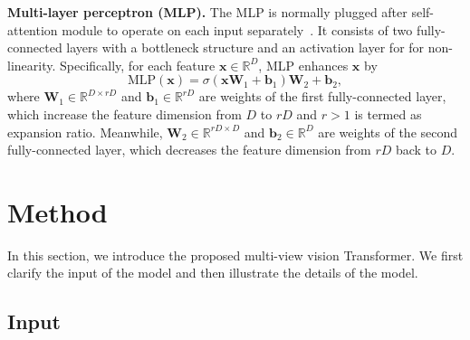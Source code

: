 \documentclass{bmvc2k}
\begin{document}
\vspace{0.1in}

\noindent \textbf{Multi-layer perceptron (MLP).} The MLP is normally plugged after self-attention module to operate on each input separately~\cite{vaswani2017attention}. It consists of two fully-connected layers with a bottleneck structure and an activation layer for for non-linearity. Specifically, for each feature $\mathbf{x} \in \mathbb{R}^{D}$, MLP enhances $\mathbf{x}$ by 
\begin{equation}
    \mathrm{MLP}(\mathbf{x}) = \sigma(\mathbf{x}\mathbf{W}_1+\mathbf{b}_1)\mathbf{W}_2 + \mathbf{b}_2,
\end{equation}
where $\mathbf{W}_1 \in \mathbb{R}^{D \times rD}$ and $\mathbf{b}_1 \in \mathbb{R}^{rD}$ are weights of the first fully-connected layer,  which increase the feature dimension from $D$ to $rD$ and $r>1$ is termed as expansion ratio. Meanwhile, $\mathbf{W}_2 \in \mathbb{R}^{rD \times D}$ and $\mathbf{b}_2 \in \mathbb{R}^{D}$ are weights of the second fully-connected layer,  which decreases the feature dimension from $rD$ back to $D$.

\vspace{-0.1in}
\section{Method}
In this section, we introduce the proposed multi-view vision Transformer. We first clarify the input of the model and then illustrate the details of the model.


\vspace{-0.1in}

\subsection{Input} 
\end{document}
